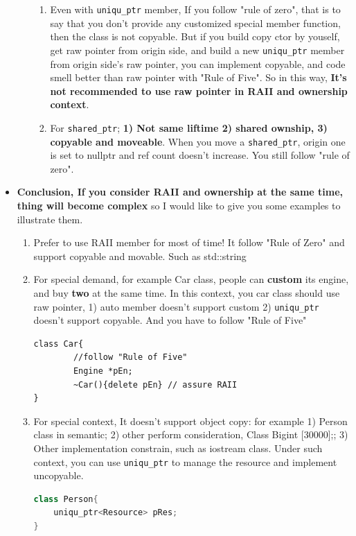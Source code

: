 \documentclass[a4paper,11pt,twoside]{book}
\begin{document}
\begin{itemize}
\begin{enumerate}
\begin{enumerate}
			\item Even with \texttt{uniqu\_ptr} member, If you follow "rule of zero", that is to say that you don't provide any customized special member function, then the class is not copyable. But if you build copy ctor by youself, get raw pointer from origin side, and build a new \texttt{uniqu\_ptr} member from origin side's raw pointer, you can implement copyable, and code smell better than raw pointer with "Rule of Five". So in this way, \textbf{It's not recommended to use raw pointer in RAII and ownership context}.

			\item For \texttt{shared\_ptr}; \textbf{1) Not same liftime 2) shared ownship, 3) copyable and moveable}. When you move a \texttt{shared\_ptr}, origin one is set to nullptr and ref count doesn't increase.  You still follow "rule of zero".
\end{enumerate}

	\end{enumerate}

	
	\item \textbf{ Conclusion, If you consider RAII and ownership at the same time, thing will become complex}  so I would like to give you some examples to illustrate them.
	
	\begin{enumerate}
		\item Prefer to use RAII member for most of time! It follow "Rule of Zero" and support copyable and movable. Such as std::string
		
		\item  For special demand, for example Car class,  people can \textbf{custom} its engine, and buy \textbf{two} at the same time. In this context, you car class should use raw pointer, 1) auto member doesn't support custom 2) \texttt{uniqu\_ptr} doesn't support copyable.  And you have to follow "Rule of Five"
\begin{lstlisting}[numbers=none]
class Car{
		//follow "Rule of Five"
		Engine *pEn;
		~Car(){delete pEn} // assure RAII
}
\end{lstlisting}
		
		\item For special context, It doesn't support object copy: for example 1) Person class in semantic;  2) other  perform consideration, Class Big{int [30000];};  3) Other implementation constrain, such as iostream class. Under such context, you can use \texttt{uniqu\_ptr} to manage the resource and implement uncopyable.
\begin{lstlisting}[frame=single, language=c++]
class Person{
    uniqu_ptr<Resource> pRes;
}
\end{lstlisting}
		

\end{enumerate}
\end{itemize}
\end{document}
